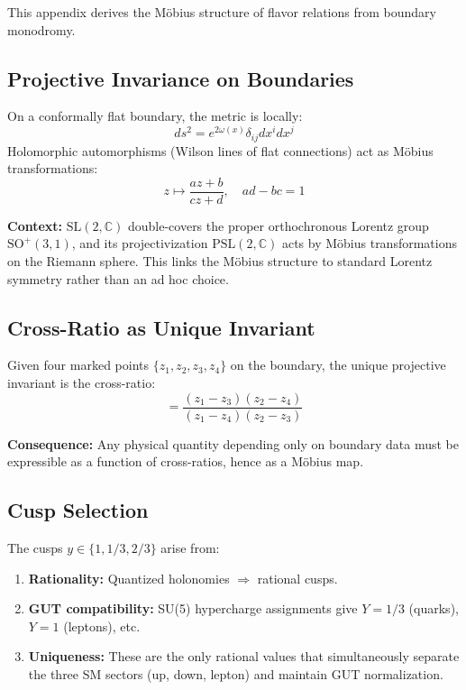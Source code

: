 This appendix derives the M\"obius structure of flavor relations from boundary monodromy.

\subsection{Projective Invariance on Boundaries}

On a conformally flat boundary, the metric is locally:
\begin{equation}
    ds^2 = e^{2\omega(x)} \delta_{ij} dx^i dx^j
\end{equation}
Holomorphic automorphisms (Wilson lines of flat connections) act as M\"obius 
transformations:
\begin{equation}
    z \mapsto \frac{az + b}{cz + d}, \quad ad - bc = 1
\end{equation}

\begin{remark}
\textbf{Context:} $\mathrm{SL}(2,\mathbb{C})$ double-covers the proper orthochronous Lorentz group $\mathrm{SO}^+(3,1)$, 
and its projectivization $\mathrm{PSL}(2,\mathbb{C})$ acts by M\"obius transformations on the Riemann sphere. 
This links the M\"obius structure to standard Lorentz symmetry rather than an ad hoc choice.
\end{remark}

\subsection{Cross-Ratio as Unique Invariant}

Given four marked points $\{z_1, z_2, z_3, z_4\}$ on the boundary, the unique 
projective invariant is the cross-ratio:
\begin{equation}
    [z_1, z_2; z_3, z_4] = \frac{(z_1 - z_3)(z_2 - z_4)}{(z_1 - z_4)(z_2 - z_3)}
\end{equation}

\textbf{Consequence:} Any physical quantity depending only on boundary data must be 
expressible as a function of cross-ratios, hence as a M\"obius map.

\subsection{Cusp Selection}

The cusps $y \in \{1, 1/3, 2/3\}$ arise from:
\begin{enumerate}[leftmargin=1.5em, topsep=2pt, itemsep=1pt]
    \item \textbf{Rationality:} Quantized holonomies $\Rightarrow$ rational cusps.
    \item \textbf{GUT compatibility:} SU(5) hypercharge assignments give 
        $Y = 1/3$ (quarks), $Y = 1$ (leptons), etc.
    \item \textbf{Uniqueness:} These are the only rational values that simultaneously 
        separate the three SM sectors (up, down, lepton) and maintain GUT normalization.
\end{enumerate}


